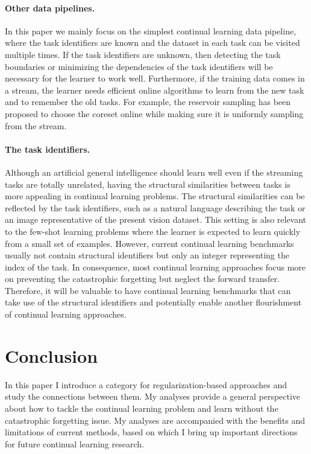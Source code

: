 \paragraph{Other data pipelines.} In this paper we mainly focus on the simplest continual learning data pipeline, where the task identifiers are known and the dataset in each task can be visited multiple times. If the task identifiers are unknown, then detecting the task boundaries \citep{titsias2019functional} or minimizing the dependencies of the task identifiers will be necessary for the learner to work well. Furthermore, if the training data comes in a stream, the learner needs efficient online algorithms to learn from the new task and to remember the old tasks. For example, the reservoir sampling \citep{buzzega2020dark} has been proposed to choose the coreset online while making sure it is uniformly sampling from the stream.

\paragraph{The task identifiers.} Although an artificial general intelligence should learn well even if the streaming tasks are totally unrelated, having the structural similarities between tasks is more appealing in continual learning problems. The structural similarities can be reflected by the task identifiers, such as a natural language describing the task \citep{chaudhry2018efficient} or an image representative of the present vision dataset. This setting is also relevant to the few-shot learning problems \citep{snell2017prototypical} where the learner is expected to learn quickly from a small set of examples. However, current continual learning benchmarks usually not contain structural identifiers but only an integer representing the index of the task. In consequence, most continual learning approaches focus more on preventing the catastrophic forgetting but neglect the forward transfer. Therefore, it will be valuable to have continual learning benchmarks that can take use of the structural identifiers and potentially enable another flourishment of continual learning approaches.

 
\section{Conclusion}
In this paper I introduce a category for regularization-based approaches and study the connections between them. My analyses provide a general perspective about how to tackle the continual learning problem and learn without the catastrophic forgetting issue. My analyses are accompanied with the benefits and limitations of current methods, based on which I bring up important directions for future continual learning research.